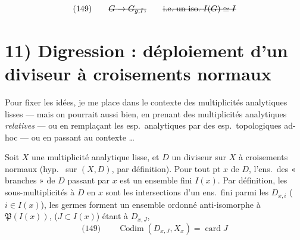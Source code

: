 \documentclass[11pt,a4paper]{article}
\begin{document}
 
\[
  \text{(149)}\qquad \text{\struck{$G \to G_{g,I}$,}}
  \qquad \text{\struck{i.e.\ un iso.\ $I(G) \simeq I$}}
\]



\section{11) Digression : déploiement d'un diviseur à croisements normaux}

Pour fixer les idées, je me place dans le contexte des multiplicités analytiques
lisses --- mais on pourrait aussi bien, en prenant des multiplicités analytiques
\emph{relatives} --- ou en remplaçant les esp.\ analytiques par des esp.\ topologiques
ad-hoc --- ou en passant au contexte  …

Soit $X$ une multiplicité analytique lisse, et $D$ un diviseur sur $X$ à
croisements normaux (hyp.\ \ill{} \ill{} sur $(X, D)$, par définition).
 Pour tout pt $x$ de $D$, l'ens.\ des « branches » de $D$
passant par $x$ est un ensemble fini $I(x)$.
Par définition, les  sous-multiplicités  à $D$ en $x$
sont les intersections d'un ens.\ fini  parmi les $D_{x,i}$ ($i \in I(x)$),
les germes \struck{\ill{}} forment un ensemble ordonné  
anti-isomorphe à $\mathfrak{P}(I(x))$, ($J \subset I(x)$) étant  \struck{\ill{}}
à $D_{x,J}$,
\[
  \text{(149)}\qquad \operatorname{Codim}(D_{x,J}, X_x) = \operatorname{card} J
\]
\end{document}
